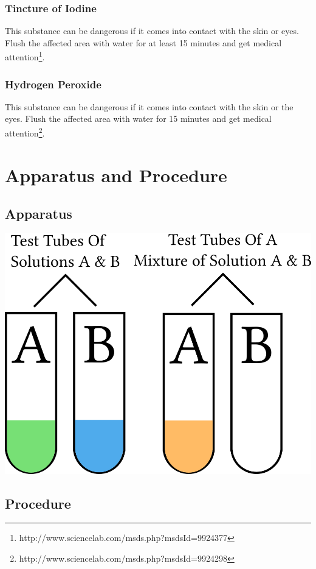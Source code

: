 \documentclass[11pt]{article}
\begin{document}
\subsubsection{Tincture of Iodine}
This substance can be dangerous if it comes into contact with the skin or eyes. Flush the affected area with water for at least 15 minutes and get medical attention\footnote{http://www.sciencelab.com/msds.php?msdsId=9924377}. 
\subsubsection{Hydrogen Peroxide}
This substance can be dangerous if it comes into contact with the skin or the eyes. Flush the affected area with water for 15 minutes and get medical attention\footnote{http://www.sciencelab.com/msds.php?msdsId=9924298}. 
\section{Apparatus and Procedure}
\subsection{Apparatus}
\includegraphics[width=\textwidth]{IodineApp}
\subsection{Procedure}
\end{document}

